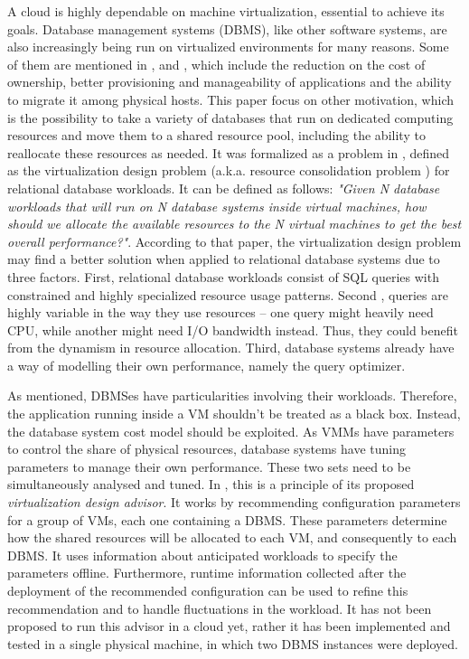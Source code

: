 A cloud is highly dependable on machine virtualization, essential to achieve its goals. Database management systems (DBMS), like other software systems, are also increasingly being run on virtualized environments for many reasons. Some of them are mentioned in \cite{4498282}, \cite{4401021} and \cite{Soror:2008:AVM:1376616.1376711}, which include the reduction on the cost of ownership, better provisioning and manageability of applications and the ability to migrate it among physical hosts. This paper focus on other motivation, which is the possibility to take a variety of databases that run on dedicated computing resources and move them to a shared resource pool, including the ability to reallocate these resources as needed. It was formalized as a problem in \cite{4401021}, defined as the virtualization design problem (a.k.a. resource consolidation problem ) for relational database workloads. It can be defined as follows: \textit{"Given N database workloads that will run on N database systems inside virtual machines, how should we allocate the available resources to the N virtual machines to get the best overall performance?"}. According to that paper, the virtualization design problem may find a better solution when applied to relational database systems due to three factors. First, relational database workloads consist of SQL queries with constrained and highly specialized resource usage patterns. Second , queries are highly variable in the way they use resources -- one query might heavily need CPU, while another might need I/O bandwidth instead. Thus, they could benefit from the dynamism in resource allocation. Third, database systems already have a way of modelling their own performance, namely the query optimizer.

As mentioned, DBMSes have particularities involving their workloads. Therefore, the application running inside a VM shouldn't be treated as a black box. Instead, the database system cost model should be exploited. As VMMs have parameters to control the share of physical resources, database systems have tuning parameters to manage their own performance. These two sets need to be simultaneously analysed and tuned. In \cite{Soror:2008:AVM:1376616.1376711}, this is a principle of its proposed \textit{virtualization design advisor}. It works by recommending configuration parameters for a group of VMs, each one containing a DBMS. These parameters determine how the shared resources will be allocated to each VM, and consequently to each DBMS. It uses information about anticipated workloads to specify the parameters offline. Furthermore, runtime information collected after the deployment of the recommended configuration can be used to refine this recommendation and to handle fluctuations in the workload. It has not been proposed to run this advisor in a cloud yet, rather it has been implemented and tested in a single physical machine, in which two DBMS instances were deployed.


